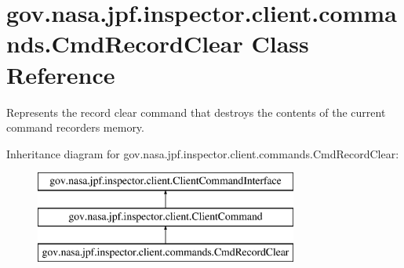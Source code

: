 \hypertarget{classgov_1_1nasa_1_1jpf_1_1inspector_1_1client_1_1commands_1_1_cmd_record_clear}{}\section{gov.\+nasa.\+jpf.\+inspector.\+client.\+commands.\+Cmd\+Record\+Clear Class Reference}
\label{classgov_1_1nasa_1_1jpf_1_1inspector_1_1client_1_1commands_1_1_cmd_record_clear}


Represents the \textquotesingle{}record clear\textquotesingle{} command that destroys the contents of the current command recorder\textquotesingle{}s memory.  


Inheritance diagram for gov.\+nasa.\+jpf.\+inspector.\+client.\+commands.\+Cmd\+Record\+Clear\+:\begin{figure}[H]
\begin{center}
\leavevmode
\includegraphics[height=3.000000cm]{classgov_1_1nasa_1_1jpf_1_1inspector_1_1client_1_1commands_1_1_cmd_record_clear}
\end{center}
\end{figure}
